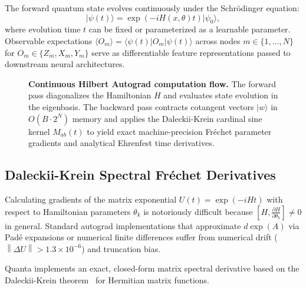 \documentclass[aps,prx,twocolumn,superscriptaddress,nofootinbib]{revtex4-2}
\newcommand{\ket}[1]{|#1\rangle}
\newcommand{\bra}[1]{\langle#1|}
\newcommand{\norm}[1]{\left\|#1\right\|}
\begin{document}
The forward quantum state evolves continuously under the Schr\"odinger equation:
\begin{equation}
    \ket{\psi(t)} = \exp(-i H(x, \theta) t) \ket{\psi_0},
\end{equation}
where evolution time $t$ can be fixed or parameterized as a learnable parameter. Observable expectations $\langle O_m \rangle = \bra{\psi(t)} O_m \ket{\psi(t)}$ across nodes $m \in \{1, \dots, N\}$ for $O_m \in \{Z_m, X_m, Y_m\}$ serve as differentiable feature representations passed to downstream neural architectures.

\begin{figure}[t]
\centering

\caption{\textbf{Continuous Hilbert Autograd computation flow.} The forward pass diagonalizes the Hamiltonian $H$ and evaluates state evolution in the eigenbasis. The backward pass contracts cotangent vectors $|w\rangle$ in $O(B \cdot 2^N)$ memory and applies the Daleckii-Krein cardinal sine kernel $M_{ab}(t)$ to yield exact machine-precision Fr\'echet parameter gradients and analytical Ehrenfest time derivatives.}
\label{fig:daleckii_krein}
\end{figure}

\subsection{Daleckii-Krein Spectral Fr\'echet Derivatives}
\label{subsec:daleckii_krein}

Calculating gradients of the matrix exponential $U(t) = \exp(-i H t)$ with respect to Hamiltonian parameters $\theta_k$ is notoriously difficult because $[H, \frac{\partial H}{\partial \theta_k}] \neq 0$ in general. Standard autograd implementations that approximate $d \exp(A)$ via Pad\'e expansions or numerical finite differences suffer from numerical drift ($\norm{\Delta U} > 1.3 \times 10^{-6}$) and truncation bias.

Quanta implements an exact, closed-form matrix spectral derivative based on the Daleckii-Krein theorem~\cite{daleckii1974stability,mathias1996chain} for Hermitian matrix functions.
\end{document}
